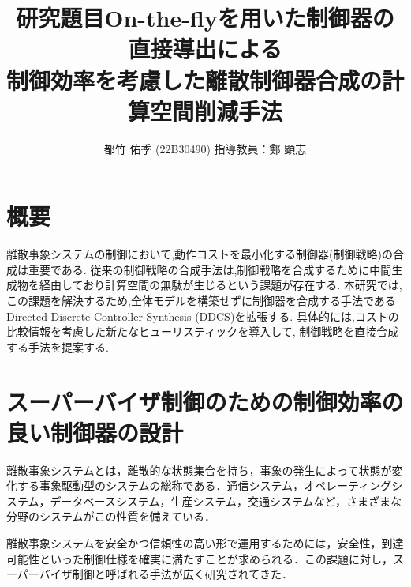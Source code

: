 \documentclass[11pt]{jarticle}
\begin{document}

\title{研究題目}
\title{On-the-flyを用いた制御器の直接導出による\\制御効率を考慮した離散制御器合成の計算空間削減手法}
\author{都竹 佑季 (22B30490) \;\; 指導教員：鄭 顕志}
\date{\empty} %
\maketitle %
\thispagestyle{fancy}


\section{概要} %
離散事象システムの制御において,動作コストを最小化する制御器(制御戦略)の合成は重要である.
従来の制御戦略の合成手法は,制御戦略を合成するために中間生成物を経由しており計算空間の無駄が生じるという課題が存在する.
本研究では,この課題を解決するため,全体モデルを構築せずに制御器を合成する手法であるDirected Discrete Controller Synthesis (DDCS)\cite{ddcs}を拡張する.
具体的には,コストの比較情報を考慮した新たなヒューリスティックを導入して, 制御戦略を直接合成する手法を提案する.

\section{スーパーバイザ制御のための制御効率の良い制御器の設計}
離散事象システムとは，離散的な状態集合を持ち，事象の発生によって状態が変化する事象駆動型のシステムの総称である．通信システム，オペレーティングシステム，データベースシステム，生産システム，交通システムなど，さまざまな分野のシステムがこの性質を備えている．

離散事象システムを安全かつ信頼性の高い形で運用するためには，安全性，到達可能性といった制御仕様を確実に満たすことが求められる．この課題に対し，スーパーバイザ制御と呼ばれる手法が広く研究されてきた．
\end{document}
